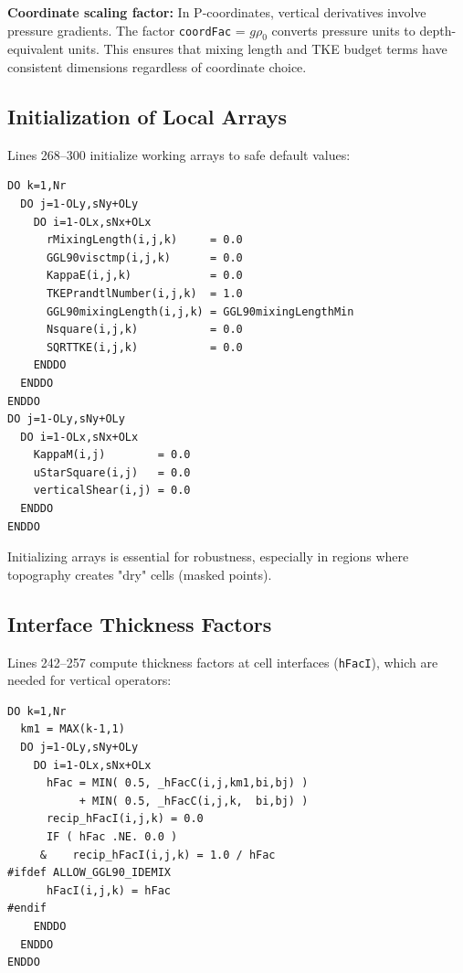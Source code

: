 \documentclass[12pt,letterpaper]{article}
\begin{document}
\textbf{Coordinate scaling factor:} In P-coordinates, vertical derivatives
involve pressure gradients. The factor \texttt{coordFac} = $g \rho_0$ converts
pressure units to depth-equivalent units. This ensures that mixing length and
TKE budget terms have consistent dimensions regardless of coordinate choice.

\subsection{Initialization of Local Arrays}

Lines 268--300 initialize working arrays to safe default values:

\begin{lstlisting}[caption={\texttt{ggl90\_calc.F}, lines 268--300 (excerpts) -- Array initialization.}]
DO k=1,Nr
  DO j=1-OLy,sNy+OLy
    DO i=1-OLx,sNx+OLx
      rMixingLength(i,j,k)     = 0.0
      GGL90visctmp(i,j,k)      = 0.0
      KappaE(i,j,k)            = 0.0
      TKEPrandtlNumber(i,j,k)  = 1.0
      GGL90mixingLength(i,j,k) = GGL90mixingLengthMin
      Nsquare(i,j,k)           = 0.0
      SQRTTKE(i,j,k)           = 0.0
    ENDDO
  ENDDO
ENDDO
DO j=1-OLy,sNy+OLy
  DO i=1-OLx,sNx+OLx
    KappaM(i,j)        = 0.0
    uStarSquare(i,j)   = 0.0
    verticalShear(i,j) = 0.0
  ENDDO
ENDDO
\end{lstlisting}

Initializing arrays is essential for robustness, especially in regions where
topography creates "dry" cells (masked points).

\subsection{Interface Thickness Factors}

Lines 242--257 compute thickness factors at cell interfaces (\texttt{hFacI}),
which are needed for vertical operators:

\begin{lstlisting}[caption={\texttt{ggl90\_calc.F}, lines 242--257 -- Interface thickness calculation.}]
DO k=1,Nr
  km1 = MAX(k-1,1)
  DO j=1-OLy,sNy+OLy
    DO i=1-OLx,sNx+OLx
      hFac = MIN( 0.5, _hFacC(i,j,km1,bi,bj) )
           + MIN( 0.5, _hFacC(i,j,k,  bi,bj) )
      recip_hFacI(i,j,k) = 0.0
      IF ( hFac .NE. 0.0 )
     &    recip_hFacI(i,j,k) = 1.0 / hFac
#ifdef ALLOW_GGL90_IDEMIX
      hFacI(i,j,k) = hFac
#endif
    ENDDO
  ENDDO
ENDDO
\end{lstlisting}
\end{document}
